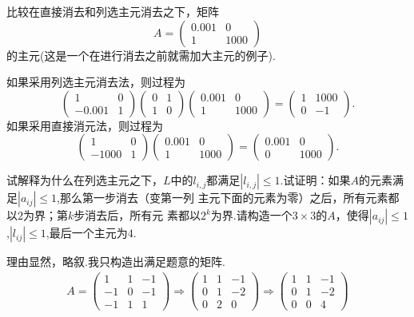 ﻿\documentclass{book} \usepackage{exsheets} \usepackage{xeCJK}
\begin{document}
\begin{solution}
\begin{figure}[h]
  \caption{ }
  \label{fig:1.5.11}
\end{figure}
\end{solution}
\begin{question}
  比较在直接消去和列选主元消去之下，矩阵
$$
A=
\begin{pmatrix}
  0.001&0\\
1&1000
\end{pmatrix}
$$
的主元(这是一个在进行消去之前就需加大主元的例子).
\end{question}
\begin{solution}
如果采用列选主元消去法，则过程为
$$
\begin{pmatrix}
  1&0\\
-0.001&1
\end{pmatrix}
\begin{pmatrix}
  0&1\\
1&0
\end{pmatrix}
\begin{pmatrix}
  0.001&0\\
1&1000
\end{pmatrix}=
\begin{pmatrix}
  1&1000\\
0&-1
\end{pmatrix}.
$$
如果采用直接消元法，则过程为
$$
\begin{pmatrix}
  1&0\\
-1000&1
\end{pmatrix}
\begin{pmatrix}
  0.001&0\\
1&1000
\end{pmatrix}=
\begin{pmatrix}
  0.001&0\\
0&1000
\end{pmatrix}.
$$
\end{solution}
\begin{question}
  试解释为什么在列选主元之下，$L$中的$l_{i,j}$都满足$|l_{i,j}|\leq
  1$.试证明：如果$A$的元素满足$|a_{ij}|\leq 1$,那么第一步消去（变第一列
  主元下面的元素为零）之后，所有元素都以$2$为界；第$k$步消去后，所有元
  素都以$2^k$为界.请构造一个$3\times 3$的$A$，使得$|a_{ij}|\leq
  1$,$|l_{ij}|\leq 1$,最后一个主元为$4$.
\end{question}
\begin{solution}
 理由显然，略叙.我只构造出满足题意的矩阵.
\begin{align*}
A=\begin{pmatrix}
1  & 1&-1 \\
-1&0&-1      \\
-1&1&1
\end{pmatrix}\Rightarrow
      \begin{pmatrix}
        1&1&-1\\
0&1&-2 \\
0&2&0
      \end{pmatrix}\Rightarrow
      \begin{pmatrix}
        1&1&-1\\
0&1&-2\\
0&0&4
      \end{pmatrix}
\end{align*}
\end{solution}
\end{document}
